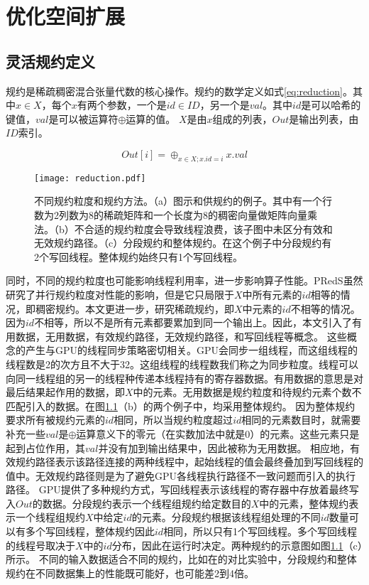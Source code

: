 
\chapter{优化空间扩展}

\section{灵活规约定义}
规约是稀疏稠密混合张量代数的核心操作。规约的数学定义如式\eqref{eq:reduction}。其中$x \in X$，每个$x$有两个参数，一个是$id\in ID$，另一个是$val$。其中$id$是可以哈希的键值，$val$是可以被运算符$\oplus$运算的值。
$X$是由$x$组成的列表，$Out$是输出列表，由$ID$索引。

\begin{equation}
  Out[i] = \oplus_{x\in X;x.id=i} x.val
  \label{eq:reduction}
\end{equation}
\begin{figure}[h]%
  \centering
  \texttt{[image: reduction.pdf]}
  \caption{不同规约粒度和规约方法。（a）图示和供规约的例子。其中有一个行数为2列数为8的稀疏矩阵和一个长度为8的稠密向量做矩阵向量乘法。（b）不合适的规约粒度会导致线程浪费，该子图中未区分有效和无效规约路径。（c）分段规约和整体规约。在这个例子中分段规约有2个写回线程。整体规约始终只有1个写回线程。}
  \label{fig:reductions}
\end{figure}
同时，不同的规约粒度也可能影响线程利用率，进一步影响算子性能。PRedS\cite{yu2021exploiting}虽然研究了并行规约粒度对性能的影响，但是它只局限于$X$中所有元素的$id$相等的情况，即稠密规约。本文更进一步，研究稀疏规约，即$X$中元素的$id$不相等的情况。
因为$id$不相等，所以不是所有元素都要累加到同一个输出上。因此，本文引入了有用数据，无用数据，有效规约路径，无效规约路径，和写回线程等概念。
这些概念的产生与GPU的线程同步策略密切相关。GPU会同步一组线程，而这组线程的线程数是2的次方且不大于32。这组线程的线程数我们称之为同步粒度。线程可以向同一线程组的另一的线程种传递本线程持有的寄存器数据。有用数据的意思是对最后结果起作用的数据，即$X$中的元素。无用数据是规约粒度和待规约元素个数不匹配引入的数据。在图\ref{fig:reductions}（b）的两个例子中，均采用整体规约。
因为整体规约要求所有被规约元素的$id$相同，所以当规约粒度超过$id$相同的元素数目时，就需要补充一些$val$是$\oplus$运算意义下的零元（在实数加法中就是0）的元素。这些元素只是起到占位作用，其$val$并没有加到输出结果中，因此被称为无用数据。
相应地，有效规约路径表示该路径连接的两种线程中，起始线程的值会最终叠加到写回线程的值中。无效规约路径则是为了避免GPU各线程执行路径不一致问题而引入的执行路径。
GPU提供了多种规约方式，写回线程表示该线程的寄存器中存放着最终写入$Out$的数据。分段规约表示一个线程组规约给定数目的$X$中的元素，整体规约表示一个线程组规约$X$中给定$id$的元素。分段规约根据该线程组处理的不同$id$数量可以有多个写回线程，整体规约因此$id$相同，所以只有1个写回线程。多个写回线程的线程号取决于$X$中的$id$分布，因此在运行时决定。两种规约的示意图如图\ref{fig:reductions}（c）所示。
不同的输入数据适合不同的规约，比如在\cite{dai2022heuristic}的对比实验中，分段规约和整体规约在不同数据集上的性能既可能好，也可能差2到4倍。


